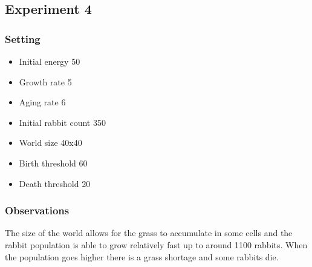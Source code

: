 \documentclass[11pt]{article}
\begin{document}
\subsection{Experiment 4}
\subsubsection{Setting}
\begin{itemize}
  \item Initial energy 50
  \item Growth rate 5
  \item Aging rate 6
  \item Initial rabbit count 350
  \item World size 40x40
  \item Birth threshold 60
  \item Death threshold 20
\end{itemize}

\subsubsection{Observations}
The size of the world allows for the grass to accumulate in some cells
and the rabbit population is able to grow relatively fast up to around
1100 rabbits. When the population goes higher there is a grass
shortage and some rabbits die.
\end{document}
